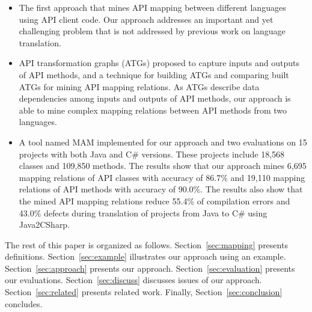 \begin{itemize}\vspace*{-1.5ex}
\item The first approach that mines API mapping between
different languages using API client code. Our
approach addresses an important and yet challenging problem that is not
addressed by previous work on language translation.\vspace*{-1.5ex}
\item API transformation graphs (ATGs) proposed to capture inputs
and outputs of API methods, and a technique for building ATGs
and comparing built ATGs for mining API mapping relations.
As ATGs describe data dependencies among
inputs and outputs of API methods, our approach is able to mine
complex mapping relations between API methods from two languages.\vspace*{-1.5ex}
\item A tool named MAM implemented for our approach and two
evaluations on 15 projects with both Java and C\# versions. These
projects include 18,568 classes and 109,850 methods. The results
show that our approach mines 6,695 mapping relations of API classes
with accuracy of 86.7\% and 19,110 mapping relations of API
methods with accuracy of 90.0\%. The results also show that the
mined API mapping relations reduce 55.4\% of compilation errors and
43.0\% defects during translation of projects from Java to C\# using
Java2CSharp.
\end{itemize}\vspace*{-1.5ex}

The rest of this paper is organized as follows. 
Section~\ref{sec:mapping} presents definitions.
Section~\ref{sec:example} illustrates our approach using an example. 
Section~\ref{sec:approach} presents our approach. 
Section~\ref{sec:evaluation} presents our evaluations.
Section~\ref{sec:discuss} discusses issues of our approach.
Section~\ref{sec:related} presents related work. 
Finally, Section~\ref{sec:conclusion} concludes.
